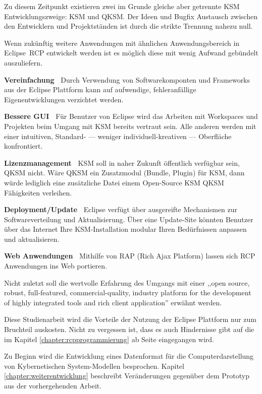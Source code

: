 \documentclass[%
12pt,titlepage,abstracton,DIV=10,BCOR=0.5cm]{scrreprt}
\begin{document}
Zu diesem Zeitpunkt existieren zwei im Grunde gleiche aber getrennte KSM
Entwicklungszweige: KSM und QKSM. Der Ideen und Bugfix Austausch zwischen den
Entwicklern und Projektständen ist durch die strikte Trennung nahezu null.

Wenn zukünftig weitere Anwendungen mit ähnlichen Anwendungsbereich in
Eclipse~RCP entwickelt werden ist es möglich diese mit wenig Aufwand gebündelt
auszuliefern.

\textbf{Vereinfachung\ } Durch Verwendung von Softwarekomponten und Frameworks
aus der Eclipse Plattform kann auf aufwendige, fehleranfällige
Eigenentwicklungen verzichtet werden.

\textbf{Bessere GUI\ } Für Benutzer von Eclipse wird das Arbeiten mit Workspaces
und Projekten beim Umgang mit KSM bereits vertraut sein. Alle anderen werden mit
einer intuitiven, Standard- --- weniger individuell-kreativen --- Oberfläche
konfrontiert.

\textbf{Lizenzmanagement\ } KSM soll in naher Zukunft öffentlich verfügbar
sein, QKSM nicht. Wäre QKSM ein Zusatzmodul (Bundle, Plugin) für KSM, dann
würde lediglich eine zusätzliche Datei einem Open-Source KSM QKSM Fähigkeiten
verleihen.

\textbf{Deployment/Update\ } Eclipse verfügt über ausgereifte Mechanismen zur
Softwareverteilung und Aktualisierung. Über eine Update-Site könnten Benutzer
über das Internet Ihre KSM-Installation modular Ihren Bedürfnissen anpassen und
aktualisieren.

\textbf{Web Anwendungen\ } Mithilfe von RAP (Rich Ajax Platform) lassen sich
RCP Anwendungen ins Web portieren.

Nicht zuletzt soll die wertvolle Erfahrung des Umgangs mit einer ,,open source,
robust, full-featured, commercial-quality, industry platform for the development
of highly integrated tools and rich client application'' erwähnt werden.

\vspace{1cm}

Diese Studienarbeit wird die Vorteile der Nutzung der Eclipse Plattform nur zum
Bruchteil auskosten. Nicht zu vergessen ist, dass es auch Hindernisse gibt auf
die im Kapitel \ref{chapter:rcpprogrammierung} ab Seite
\pageref{chapter:rcpprogrammierung} eingegangen wird.

Zu Beginn wird die Entwicklung eines Datenformat für die Computerdarstellung von
Kybernetischen System-Modellen besprochen. Kapitel
\ref{chapter:weiterentwicklung} beschreibt Veränderungen gegenüber dem Prototyp
aus der vorhergehenden Arbeit.
\end{document}
